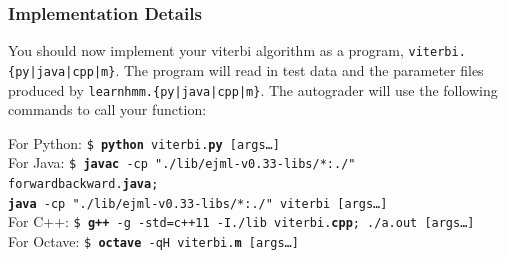 \documentclass{article}
\begin{document}
\subsubsection{Implementation Details}

You should now implement your viterbi algorithm as a program, \texttt{viterbi.\{py|java|cpp|m\}}. The program will read in test data and the parameter files produced by \texttt{learnhmm.\{py|java|cpp|m\}}. The autograder will use the following commands to call your function:

\begin{tabbing}
For Python: \=\texttt{\$ \textbf{python} viterbi.\textbf{py} [args\dots]}\\
For Java: \>\texttt{\$ \textbf{javac} -cp "./lib/ejml-v0.33-libs/*:./" forwardbackward.\textbf{java};\\ \>  \texttt{\textbf{java} -cp "./lib/ejml-v0.33-libs/*:./" viterbi [args\dots]}}\\
For C++: \>\texttt{\$ \textbf{g++} -g -std=c++11 -I./lib viterbi.\textbf{cpp}; ./a.out [args\dots]}\\
For Octave: \>\texttt{\$ \textbf{octave} -qH viterbi.\textbf{m} [args\dots]}
\end{tabbing}
\end{document}

